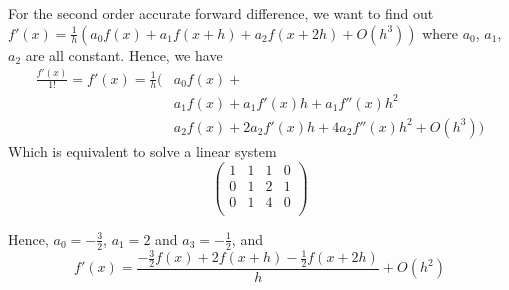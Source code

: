 \documentclass[
	12pt, %
]{fphw}
\numberwithin{equation}{section}
\numberwithin{figure}{section}
\numberwithin{table}{section}
\begin{document}
For the second order accurate forward difference,
we want to find out $f'(x)=\frac{1}{h}(a_0f(x)+a_1f(x+h)+a_2f(x+2h)+O(h^3))$
where $a_0$, $a_1$, $a_2$ are all constant.
Hence, we have
\begin{equation}
	\begin{aligned}
		\frac{f'(x)}{1 !} = f'(x)= \frac{1}{h}( & a_0 f(x)+                                         \\
		                                        & a_1 f(x)+a_1 f'(x) h+a_1 f''(x) h^2               \\
		                                        & a_2 f(x)+2 a_2 f'(x) h+4 a_2 f''(x) h^2 + O(h^3))
	\end{aligned}
\end{equation}
Which is equivalent to solve a linear system
\begin{equation}
	\left(
	\begin{array}{ccc|c}
		1 & 1 & 1 & 0 \\
		0 & 1 & 2 & 1 \\
		0 & 1 & 4 & 0 \\
	\end{array}
	\right)
\end{equation}

Hence, $a_0 = -\frac{3}{2}$, $a_1=2$ and $a_3 = -\frac{1}{2}$, and
\begin{equation}f' (x)=\frac{-\frac{3}{2}f (x)+2f (x+h) -\frac{1}{2}f (x+2h)}{h}+O(h^2)\end{equation}
\end{document}
